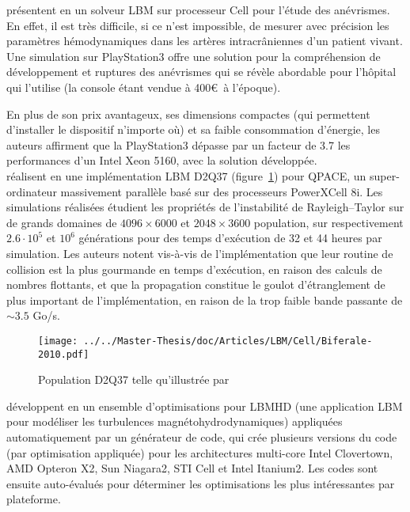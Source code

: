 \citet{sturmer_fluid_2009} présentent en \citeyear{sturmer_fluid_2009} un solveur \acs{LBM} sur processeur Cell pour l'étude des anévrismes. En effet, il est très difficile, si ce n'est impossible, de mesurer avec précision les paramètres hémodynamiques dans les artères intracrâniennes d'un patient vivant. Une simulation sur PlayStation3 offre une solution pour la compréhension de développement et ruptures des anévrismes qui se révèle abordable pour l'hôpital qui l'utilise (la console étant vendue à 400\euro~à l'époque).

En plus de son prix avantageux, ses dimensions compactes (qui permettent d'installer le dispositif n'importe où) et sa faible consommation d'énergie, les auteurs affirment que la PlayStation3 dépasse par un facteur de 3.7 les performances d'un Intel Xeon 5160, avec la solution développée.\\

\citet{biferale_lattice_2010} réalisent en \citeyear{biferale_lattice_2010} une implémentation \acs{LBM} D2Q37 (figure~\ref{fig:d2q37})  pour QPACE, un super-ordinateur massivement parallèle basé sur des processeurs PowerXCell 8i.
Les simulations réalisées étudient les propriétés de l'instabilité de Rayleigh–Taylor sur de grands domaines de $4096\times 6000$ et $2048\times 3600$ population, sur respectivement $2.6\cdot 10^5$ et $10^6$ générations pour des temps d'exécution de 32 et 44 heures par simulation. 
Les auteurs notent vis-à-vis de l'implémentation que leur routine de collision est la plus gourmande en temps d'exécution, en raison des calculs de nombres flottants, et que la propagation constitue le goulot d'étranglement de plus important de l'implémentation, en raison de la trop faible bande passante de $\sim 3.5$ Go/s.

\begin{figure}[h]
	\centering
	\texttt{[image: ../../Master-Thesis/doc/Articles/LBM/Cell/Biferale-2010.pdf]}
	\caption{Population D2Q37 telle qu'illustrée par \citet{biferale_lattice_2010}}
	\label{fig:d2q37}
\end{figure}

\citet{williams_lattice_2008} développent en \citeyear{williams_lattice_2008}  un ensemble d'optimisations pour LBMHD (une application \acs{LBM} pour modéliser les turbulences magnétohydrodynamiques) appliquées automatiquement par un générateur de code, qui crée plusieurs versions du code (par optimisation appliquée) pour les architectures multi-core Intel Clovertown, AMD Opteron X2, Sun Niagara2, STI Cell et Intel Itanium2. Les codes sont ensuite auto-évalués pour déterminer les optimisations les plus intéressantes par plateforme.

